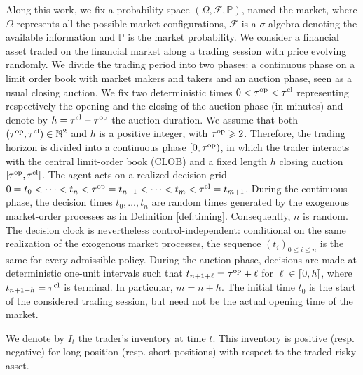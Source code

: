 \documentclass[11pt]{article}
\begin{document}
Along this work, we fix a probability space $(\Omega, \mathcal{F}, \mathbb{P})$, named the market, where $\Omega$ represents all the possible market configurations, $\mathcal F$ is a $\sigma$-algebra denoting the available information and $\mathbb P$ is the market probability. We consider a financial asset traded on the financial market along a trading session with price evolving randomly. We divide the trading period into two phases: a continuous phase on a limit order book with market makers and takers and an auction phase, seen as a usual closing auction. We fix two deterministic times $0< \tau^{\mathrm{op}}< \tau^{\mathrm{cl}}$ representing respectively the opening and the closing of the auction phase (in minutes) and denote by $h= \tau^{\mathrm{cl}}- \tau^{\mathrm{op}}$ the auction duration. We assume that both $( \tau^{\mathrm{op}},  \tau^{\mathrm{cl}}) \in \mathbb{N}^2$ and $h$ is a positive integer, {with $\tau^{\mathrm{op}}\geqslant2$}. Therefore, the trading horizon is divided into a continuous phase $[ 0,  \tau^{\mathrm{op}} )$, in which the trader interacts with the central limit-order book (CLOB) and a fixed length $h$ closing auction $[ \tau^{\mathrm{op}}, \tau^{\mathrm{cl}}]$. {The agent acts on a realized decision grid $0=t_0<\cdots<t_n<\tau^{\mathrm{op}}=t_{n+1} <\cdots<t_m<\tau^{\mathrm{cl}}=t_{m+1}$. During the continuous phase, the decision times $t_0,\ldots,t_n$ are random times generated by the exogenous market-order processes as in Definition \ref{def:timing}. Consequently, $n$ is random. The decision clock is nevertheless control-independent: conditional on the same realization of the exogenous market processes, the sequence $(t_i)_{0\leqslant i\leqslant n}$ is the same for every admissible policy. During the auction phase, decisions are made at deterministic one-unit intervals such that $t_{n+1+\ell}=\tau^{\mathrm{op}}+\ell$ for $\ell \in \llbracket 0,h \rrbracket$, where $t_{n+1+h}=\tau^{\mathrm{cl}}$ is terminal. In particular, $m=n+h$. The initial time $t_0$ is the start of the considered trading session, but need not be the actual opening time of the market.}\vspace{0.5em}
 
 We denote by $I_t$ the trader's inventory at time $t$. This inventory is positive (resp. negative) for long position (resp. short positions) with respect to the traded risky asset.\vspace{0.5em}
 
\end{document}
